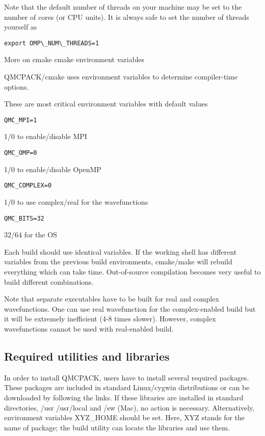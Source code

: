 Note that the default number of threads on your machine may be set to the number of cores (or CPU units). It is always safe to set the number of threads yourself as
\begin{verbatim}
export OMP\_NUM\_THREADS=1
\end{verbatim}

More on cmake
cmake environment variables

QMCPACK/cmake uses environment variables to determine compiler-time options.

These are most critical environment variables with default values
\begin{verbatim}
QMC_MPI=1
\end{verbatim}

1/0 to enable/disable MPI
\begin{verbatim}
QMC_OMP=0
\end{verbatim}

1/0 to enable/disable OpenMP
\begin{verbatim}
QMC_COMPLEX=0
\end{verbatim}

1/0 to use complex/real for the wavefunctions
\begin{verbatim}
QMC_BITS=32
\end{verbatim}

32/64 for the OS

Each build should use identical variables. If the working shell has different variables from the previous build environments, cmake/make will rebuild everything which can take time. Out-of-source compilation becomes very useful to build different combinations.

Note that separate executables have to be built for real and complex wavefunctions. One can use real wavefunction for the complex-enabled build but it will be extremely inefficient (4-8 times slower). However, complex wavefunctions cannot be used with real-enabled build. 

\subsection{Required utilities and libraries}
In order to install QMCPACK, users have to install several required packages. These packages are included in standard Linux/cygwin distributions or can be downloaded by following the links. If these libraries are installed in standard directories, /usr /usr/local and /sw (Mac), no action is necessary. Alternatively, environment variables XYZ\_HOME should be set. Here, XYZ stands for the name of package; the build utility can locate the libraries and use them.


